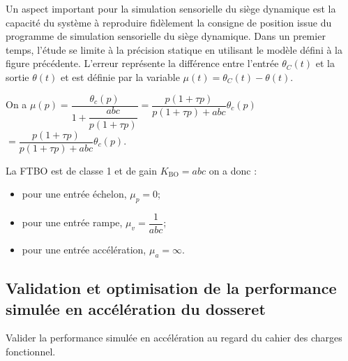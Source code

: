 \begin{multicols}{2}
Un aspect important pour la simulation sensorielle du siège dynamique
est la capacité du système à reproduire fidèlement la consigne de
position issue du programme de simulation sensorielle du siège
dynamique. Dans un premier temps, l'étude se limite à la précision
statique en utilisant le modèle défini à la figure précédente. L'erreur
représente la différence entre l'entrée $\theta_C(t)$ et la
sortie $\theta(t)$ et est définie par la variable $\mu(t) = \theta_C(t)-\theta(t)$.
\fi



\ifprof
\begin{corrige}
On a $\mu(p)=\dfrac{\theta_c(p)}{1+\dfrac{abc}{p\left( 1+\tau p\right)}}=\dfrac{p\left( 1+\tau p\right)}{p\left( 1+\tau p\right)+abc}\theta_c(p)$ $=\dfrac{p\left( 1+\tau p\right)}{p\left( 1+\tau p\right)+abc}\theta_c(p)$.

La FTBO est de classe 1 et de gain $K_{\text{BO}}={abc}$ on a donc : 
\begin{itemize}
\item pour une entrée échelon, $\mu_p = 0$;
\item pour une entrée rampe, $\mu_v = \dfrac{1}{abc}$;
\item pour une entrée accélération, $\mu_a = \infty$.
\end{itemize}
\end{corrige}
\else
\fi

\subsection*{Validation et optimisation de la performance simulée en
accélération du dosseret}

\begin{obj}
Valider la performance simulée en accélération au regard du cahier des
charges fonctionnel.
\end{obj}
%
%



\end{multicols}
